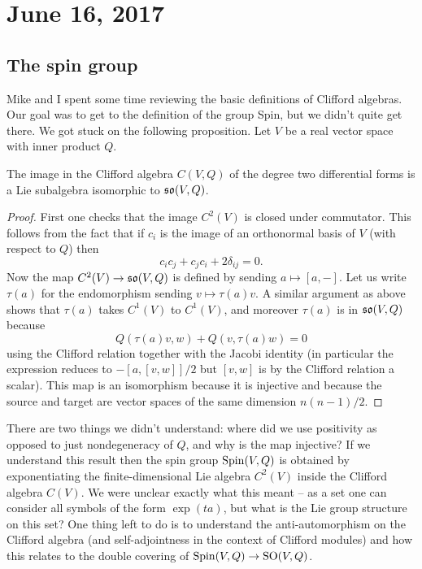 \documentclass{amsart}
\begin{document}
\section{June 16, 2017}

\subsection{The spin group}
Mike and I spent some time reviewing the basic definitions of Clifford algebras.
Our goal was to get to the definition of the group Spin, but we didn't quite get
there. We got stuck on the following proposition. Let $V$ be a real vector
space with inner product $Q$.
\begin{proposition}
    The image in the Clifford algebra $C(V,Q)$ of the degree two differential
    forms is a Lie subalgebra isomorphic to $\mathfrak{so}(V,Q)$.
\end{proposition}
\begin{proof}
    First one checks that the image $C^2(V)$ is closed under commutator.
    This follows from the fact that if $c_i$ is the image of an orthonormal
    basis of $V$ (with respect to $Q$) then
    \begin{equation*}
        c_ic_j + c_jc_i + 2\delta_{ij} = 0.
    \end{equation*}
    Now the map $C^2(V)\to\mathfrak{so}(V,Q)$ is defined by sending $a\mapsto[a,-]$.
    Let us write $\tau(a)$ for the endomorphism sending $v\mapsto \tau(a)v$.
    A similar argument as above shows that $\tau(a)$ takes $C^1(V)$ to $C^1(V)$,
    and moreover $\tau(a)$ is in $\mathfrak{so}(V,Q)$ because
    \begin{equation*}
        Q(\tau(a)v,w) + Q(v,\tau(a) w) = 0
    \end{equation*}
    using the Clifford relation together with the Jacobi identity (in particular
    the expression reduces to $-[a,[v,w]]/2$ but $[v,w]$ is by the Clifford relation
    a scalar). This map is an isomorphism because it is injective and because
    the source and target are vector spaces of the same dimension $n(n-1)/2$.
\end{proof}
There are two things we didn't understand: where did we use positivity as opposed
to just nondegeneracy of $Q$, and why is the map injective?
If we understand this result then the spin group $\operatorname{Spin}(V,Q)$ is obtained by
exponentiating the finite-dimensional Lie algebra $C^2(V)$ inside the Clifford
algebra $C(V)$. We were unclear exactly what this meant -- as a set one can
consider all symbols of the form $\exp(t a)$, but what is the Lie group structure
on this set?
One thing left to do is to understand the anti-automorphism on the Clifford
algebra (and self-adjointness in the context of Clifford modules) and how
this relates to the double covering of $\operatorname{Spin}(V,Q)\to \operatorname{SO}(V,Q)$.
\end{document}
